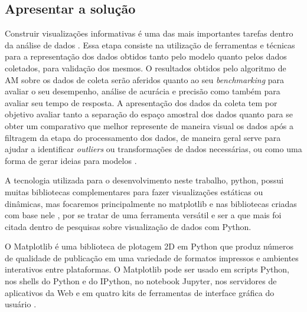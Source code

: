 \subsection{Apresentar a solução}
Construir visualizações informativas é uma das mais importantes tarefas dentro da análise de dados \cite{McKinney2012datapython}. Essa etapa consiste na utilização de ferramentas e técnicas para a representação dos dados obtidos tanto pelo modelo quanto pelos dados coletados, para validação dos mesmos. O resultados obtidos pelo algoritmo de AM sobre os dados de coleta serão aferidos quanto ao seu \textit{benchmarking} \cite{Benchmarking} para avaliar o seu desempenho, análise de acurácia e precisão como também para avaliar seu tempo de resposta. A apresentação dos dados da coleta tem por objetivo avaliar tanto a separação do espaço amostral dos dados quanto para se obter um comparativo que melhor represente de maneira visual os dados após a filtragem da etapa do processamento dos dados, de maneira geral serve para ajudar a identificar \textit{outliers} ou transformações de dados necessárias, ou como uma forma de gerar ideias para modelos \cite{McKinney2012datapython}.	
	
A tecnologia utilizada para o desenvolvimento neste trabalho, python, possui muitas bibliotecas complementares para fazer visualizações estáticas ou dinâmicas, mas focaremos principalmente no matplotlib e nas bibliotecas criadas com base nele \cite{McKinney2012datapython}, por se tratar de uma ferramenta versátil e ser a que mais foi citada dentro de pesquisas sobre visualização de dados com Python.

O Matplotlib é uma biblioteca de plotagem 2D em Python que produz números de qualidade de publicação em uma variedade de formatos impressos e ambientes interativos entre plataformas. O Matplotlib pode ser usado em scripts Python, nos shells do Python e do IPython, no notebook Jupyter, nos servidores de aplicativos da Web e em quatro kits de ferramentas de interface gráfica do usuário \cite{Matplotlib}.
